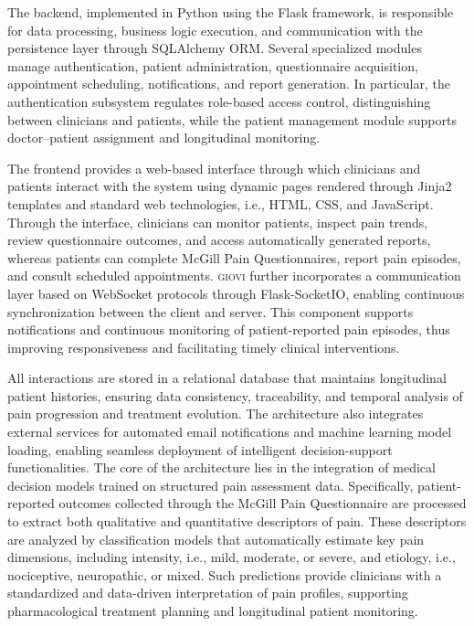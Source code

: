 \documentclass[preprint,12pt,authoryear]{elsarticle}
\newcommand{\system}{\small\textsc{giovi}\xspace}
\begin{document}
The backend, implemented in Python using the Flask framework, is responsible for data processing, business logic execution, and communication with the persistence layer through SQLAlchemy ORM. Several specialized modules manage authentication, patient administration, questionnaire acquisition, appointment scheduling, notifications, and report generation. In particular, the authentication subsystem regulates role-based access control, distinguishing between clinicians and patients, while the patient management module supports doctor--patient assignment and longitudinal monitoring.

The frontend provides a web-based interface through which clinicians and patients interact with the system using dynamic pages rendered through Jinja2 templates and standard web technologies, i.e., HTML, CSS, and JavaScript. Through the interface, clinicians can monitor patients, inspect pain trends, review questionnaire outcomes, and access automatically generated reports, whereas patients can complete McGill Pain Questionnaires, report pain episodes, and consult scheduled appointments. \system further incorporates a communication layer based on WebSocket protocols through Flask-SocketIO, enabling continuous synchronization between the client and server. This component supports notifications and continuous monitoring of patient-reported pain episodes, thus improving responsiveness and facilitating timely clinical interventions.

All interactions are stored in a relational database that maintains longitudinal patient histories, ensuring data consistency, traceability, and temporal analysis of pain progression and treatment evolution. The architecture also integrates external services for automated email notifications and machine learning model loading, enabling seamless deployment of intelligent decision-support functionalities. The core of the architecture lies in the integration of medical decision models trained on structured pain assessment data. Specifically, patient-reported outcomes collected through the McGill Pain Questionnaire are processed to extract both qualitative and quantitative descriptors of pain. These descriptors are analyzed by classification models that automatically estimate key pain dimensions, including intensity, i.e., mild, moderate, or severe, and etiology, i.e., nociceptive, neuropathic, or mixed. Such predictions provide clinicians with a standardized and data-driven interpretation of pain profiles, supporting pharmacological treatment planning and longitudinal patient monitoring.
\end{document}
